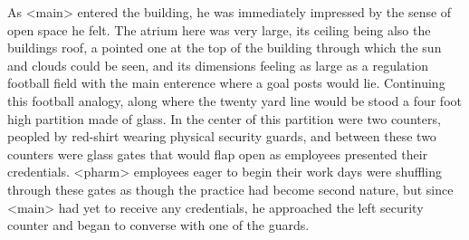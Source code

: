\documentclass[12pt,openany]{memoir}
\begin{document}
As <main> entered the building, he was immediately impressed by the sense of open space he felt.
The atrium here was very large, its ceiling being also the buildings roof, a pointed one at the top of the building through which the sun and clouds could be seen, and its dimensions feeling as large as a regulation football field with the main enterence where a goal posts would lie.
Continuing this football analogy, along where the twenty yard line would be stood a four foot high partition made of glass.
In the center of this partition were two counters, peopled by red-shirt wearing physical security guards, and between these two counters were glass gates that would flap open as employees presented their credentials.
<pharm> employees eager to begin their work days were shuffling through these gates as though the practice had become second nature, but since <main> had yet to receive any credentials, he approached the left security counter and began to converse with one of the guards.
\end{document}

